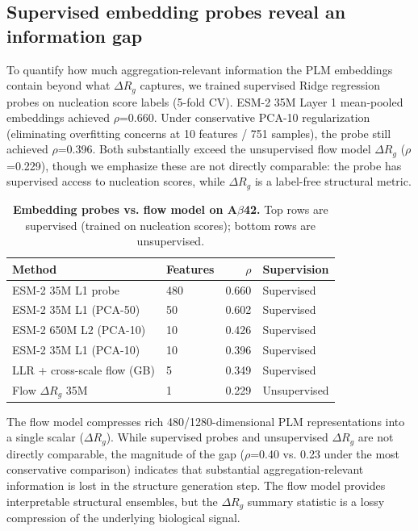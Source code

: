 \documentclass[10pt,letterpaper]{article}
\begin{document}
\subsection*{Supervised embedding probes reveal an information gap}

To quantify how much aggregation-relevant information the PLM embeddings contain beyond what $\Delta R_g$ captures, we trained supervised Ridge regression probes on nucleation score labels (5-fold CV). ESM-2 35M Layer 1 mean-pooled embeddings achieved $\rho$=0.660. Under conservative PCA-10 regularization (eliminating overfitting concerns at 10 features / 751 samples), the probe still achieved $\rho$=0.396. Both substantially exceed the unsupervised flow model $\Delta R_g$ ($\rho$=0.229), though we emphasize these are not directly comparable: the probe has supervised access to nucleation scores, while $\Delta R_g$ is a label-free structural metric.

\begin{table}[h]
\centering
\caption{{\bf Embedding probes vs. flow model on A$\beta$42.} Top rows are supervised (trained on nucleation scores); bottom rows are unsupervised.}
\begin{tabular}{llrl}
\toprule
Method & Features & $\rho$ & Supervision \\
\midrule
ESM-2 35M L1 probe & 480 & 0.660 & Supervised \\
ESM-2 35M L1 (PCA-50) & 50 & 0.602 & Supervised \\
ESM-2 650M L2 (PCA-10) & 10 & 0.426 & Supervised \\
ESM-2 35M L1 (PCA-10) & 10 & 0.396 & Supervised \\
\midrule
LLR + cross-scale flow (GB) & 5 & 0.349 & Supervised \\
Flow $\Delta R_g$ 35M & 1 & 0.229 & Unsupervised \\
\bottomrule
\end{tabular}
\label{tab:bottleneck}
\end{table}

The flow model compresses rich 480/1280-dimensional PLM representations into a single scalar ($\Delta R_g$). While supervised probes and unsupervised $\Delta R_g$ are not directly comparable, the magnitude of the gap ($\rho$=0.40 vs. 0.23 under the most conservative comparison) indicates that substantial aggregation-relevant information is lost in the structure generation step. The flow model provides interpretable structural ensembles, but the $\Delta R_g$ summary statistic is a lossy compression of the underlying biological signal.
\end{document}
